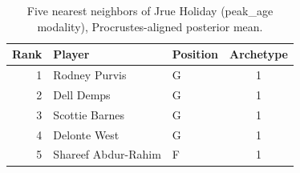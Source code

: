 \begin{table}[htbp]
  \centering\small
  \begin{tabular}{rllc}
    \toprule
    Rank & Player & Position & Archetype \\
    \midrule
    1 & Rodney Purvis & G & 1 \\
    2 & Dell Demps & G & 1 \\
    3 & Scottie Barnes & G & 1 \\
    4 & Delonte West & G & 1 \\
    5 & Shareef Abdur-Rahim & F & 1 \\
    \bottomrule
  \end{tabular}
  \caption{Five nearest neighbors of Jrue Holiday (peak_age modality), Procrustes-aligned posterior mean.}
  \label{tab:Jrue_Holiday_neighbors_peak_age}
\end{table}

